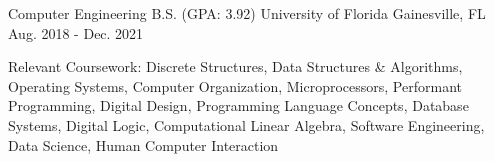\begin{cventries}
  \cventry
	{Computer Engineering B.S. (GPA: 3.92)}
	{University of Florida}
	{Gainesville, FL}
	{Aug. 2018 - Dec. 2021}
	{
		\begin{cvitems}
			\item {Relevant Coursework: Discrete Structures, Data Structures \& Algorithms, Operating Systems, Computer Organization, Microprocessors, Performant Programming, Digital Design, Programming Language Concepts, Database Systems, Digital Logic, Computational Linear Algebra, Software Engineering, Data Science, Human Computer Interaction}
		\end{cvitems}
	}
\end{cventries}
